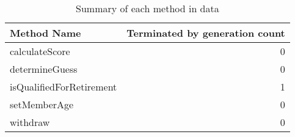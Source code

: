 \begin{table}[ht]
\centering
\begin{tabular}{lr}
  \hline
Method Name & Terminated by generation count \\ 
  \hline
calculateScore &   0 \\ 
  determineGuess &   0 \\ 
  isQualifiedForRetirement &   1 \\ 
  setMemberAge &   0 \\ 
  withdraw &   0 \\ 
   \hline
\end{tabular}
\caption{Summary of each method in data} 
\label{table:each_method_summary 5}
\end{table}
